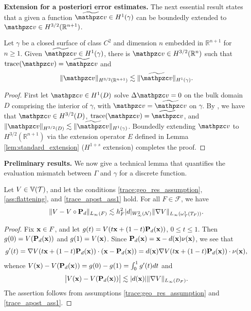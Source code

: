 \medskip\noindent
{\bf Extension for a posteriori error estimates.}
The next essential result states that a given a function $\wv \in H^1(\gamma)$
can be boundedly extended to $\tv \in H^{3/2}(\mathbb{R}^{n+1})$.
\begin{lemma}
\label{lem:harmonic_extension}
Let $\gamma$ be a closed surface of class $C^2$ and dimension $n$ embedded in $\mathbb{R}^{n+1}$ for $n\ge1$. Given $\wv \in H^1(\gamma)$, there is $\tv \in H^{3/2}(\mathbb{R}^n)$ such that ${\rm trace}(\tv)=\wv$ and
\begin{align}
\label{harmonic_ext_bound}
\|\tv\|_{H^{3/2}(\mathbb{R}^{n+1})} \lesssim \|\wv \|_{H^1(\gamma)}.
\end{align}
\end{lemma}
\begin{proof}
First let $\tv\in H^1(D)$ solve $\Delta \tv=0$ on the bulk domain $D$ comprising the interior of $\gamma$, with $\tv=\wv$ on $\gamma$.  By \cite[Theorem 5.15]{JK95}, we have that $\tv \in H^{3/2}(D)$, ${\rm trace}(\tv)=\wv$, and $\|\tv\|_{H^{3/2}(D)} \lesssim \|\wv \|_{H^1(\gamma)}$.  Boundedly extending $\tv$ to $H^{3/2}(\mathbb{R}^{n+1})$ via the extension operator $E$ defined in Lemma \ref{lem:standard_extension} ($H^{1+s}$ extension) completes the proof.
\end{proof}

\medskip\noindent
{\bf Preliminary results.}
We now give a technical lemma that quantifies the evaluation mismatch between $\Gamma$ and $\gamma$ for a discrete function.
%
\begin{lemma}\label{L:eval-mismatch}
Let $V \in \mathbb{V}(\mathcal T)$, and let the conditions \eqref{trace:geo_res_assumption}, \eqref{ass:flattening}, and \eqref{trace_apost_ass1} hold. For all $F \in \mathcal{F}$, we have
%
\begin{align}\label{discrete_trace_dif}
\|V-V \circ {\bf P}_d \|_{L_\infty(F)} \lesssim h_F^2 |d|_{W^2_\infty(\mathcal{N})}\|\nabla V \|_{L_\infty(\omega_{\mathcal{T}}^1(T_F))}.
\end{align}
\end{lemma}
\begin{proof}
Fix ${\bf x} \in F$, and let $g(t)=V (t{\bf x} + (1-t) {\bf P}_d({\bf x}))$, $0 \le t \le 1$.  Then $g(0)=V({\bf P}_d({\bf x}))$ and $g(1)=V({\bf x})$. Since ${\bf P}_d({\bf x}) = {\bf x} - d({\bf x}) \nu({\bf x})$, we see that
%
\[  
g'(t)=\nabla V(t{\bf x} + (1-t) {\bf P}_d({\bf x}))\cdot ({\bf x} -{\bf P}_d({\bf x})) = d({\bf x}) \nabla V(t{\bf x} + (1-t) {\bf P}_d({\bf x})) \cdot \nu({\bf x}),
\]
whence $V({\bf x}) -V({\bf P}_d({\bf x}))= g(0)-g(1) = \int_0^1 g'(t) dt$ and
%
\begin{align*}
\big| V({\bf x}) -V({\bf P}_d({\bf x})) \big|
\lesssim |d({\bf x})| \|\nabla V \|_{L_\infty(D_F)}.
\end{align*}
%
The assertion follows from assumptions \eqref{trace:geo_res_assumption} and \eqref{trace_apost_ass1}.
\end{proof}

